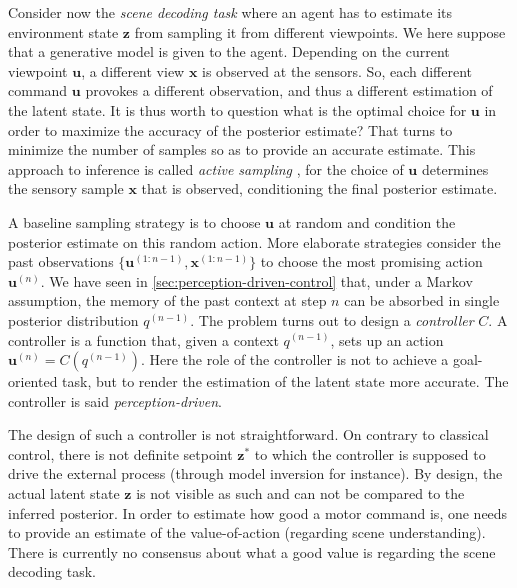 \documentclass[12pt,twoside,openright]{article}
\begin{document}
Consider now the \emph{scene decoding task} where an agent has to estimate its environment state $\boldsymbol{z}$ from sampling it from different viewpoints. We here suppose that a generative model  is given to the agent. 
Depending on  the current viewpoint $\boldsymbol{u}$, a different view $\boldsymbol{x}$ is observed at the sensors. So, each different command $\boldsymbol{u}$ provokes a different observation, and thus a different 
estimation of the latent state. It is thus worth to question what is the optimal choice for $\boldsymbol{u}$ in order to maximize the accuracy of the posterior estimate?
That turns  to minimize the number of samples so as to provide an accurate estimate. This approach to inference is called \emph{active sampling} \cite{friston2012perceptions}, for the choice of $\boldsymbol{u}$ determines the sensory sample $\boldsymbol{x}$ that is observed, conditioning the final posterior estimate.

A baseline sampling strategy is to choose $\boldsymbol{u}$ at random and condition the posterior  estimate on this random action. 
More elaborate strategies consider the past observations $\{\boldsymbol{u}^{(1:n-1)}, \boldsymbol{x}^{(1:n-1)}\}$ to choose the most promising action $\boldsymbol{u}^{(n)}$. We have seen in  \ref{sec:perception-driven-control} that, under a Markov assumption, the memory of the past context
at step $n$ can be absorbed in single posterior distribution $q^{(n-1)}$.  The problem turns out to design  a \emph{controller} $C$. A controller is a function that, given a context $q^{(n-1)}$, sets up an action $\boldsymbol{u}^{(n)} = C(q^{(n-1)})$. Here the role of the controller is not to achieve a goal-oriented task, but to render the estimation of the latent state more accurate. The controller is said \emph{perception-driven}. 

The design of such a controller is not straightforward. On contrary to classical control, there is not definite setpoint $\boldsymbol{z}^*$ to which the controller is supposed to drive the external process (through model inversion for instance). By design, the actual latent state $\boldsymbol{z}$ is not visible as such and can not be compared to the inferred posterior. In order to estimate how good a motor command is, one needs to provide an estimate of the value-of-action (regarding scene understanding). There is currently no consensus about what a good value is regarding the scene decoding task. 
\end{document}
